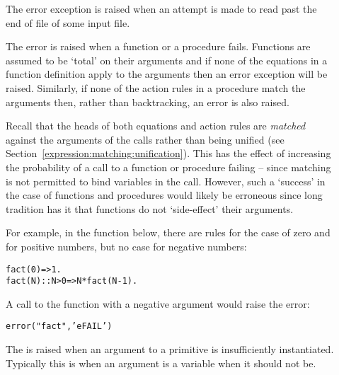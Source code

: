 \begin{description}
%  

\item[]
\label{eEOF}

The  error exception is raised when an attempt is made to read past the end of file of some input file.

\item[]
\label{eFAIL}

The  error is raised when a function or a procedure fails. Functions are assumed to be `total' on their arguments and if none of the equations in a function definition apply to the arguments then an  error exception will be raised. Similarly, if none of the action rules in a procedure match the arguments then, rather than backtracking, an  error is also raised.

Recall that the heads of both equations and action rules are \emph{matched} against the arguments of the calls rather than being unified (see Section~\vref{expression:matching:unification}). This has the effect of increasing the probability of a call to a function or procedure failing -- since matching is not permitted to bind variables in the call. However, such a `success' in the case of functions and procedures would likely be erroneous since long tradition has it that functions do not `side-effect' their arguments.

For example, in the function  below, there are rules for the case of zero and for positive numbers, but no case for negative numbers:
\begin{alltt}
fact(0)=>1.
fact(N)::N>0 => N*fact(N-1).
\end{alltt}
A call to the  function with a negative argument would raise the error:
\begin{alltt}
error("fact",'eFAIL')
\end{alltt}

\item[]
\label{eINSUFARG}
  
The  is raised when an argument to a primitive is insufficiently instantiated. Typically this is when an argument is a variable when it should not be.
  

\end{description}
